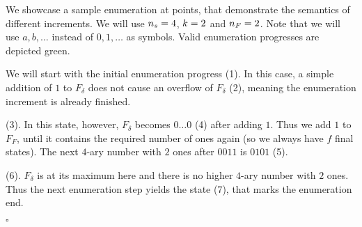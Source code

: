 \begin{example}
	We showcase a sample enumeration at points, that demonstrate the semantics of different increments. We will use ${n_s}=4$, $k=2$ and ${n_F}=2$. Note that we will use $a,b,\ldots$ instead of $0,1,\ldots$ as symbols. Valid enumeration progresses are depicted green.\par
	\vspace{0.4cm}\noindent
	\begin{minipage}{0.56\textwidth}
		We will start with the initial enumeration progress (1). In this case, a simple addition of $1$ to $F_\delta$ does not cause an overflow of $F_\delta$ (2), meaning the enumeration increment is already finished.\bigskip
		
		(3). In this state, however, $F_\delta$ becomes $0\ldots0$ (4) after adding $1$. Thus we add $1$ to $F_F$, until it contains the required number of ones again (so we always have $f$ final states). The next $4$-ary number with $2$ ones after $0011$ is $0101$ (5).\bigskip
		
		(6). $F_\delta$ is at its maximum here and there is no higher $4$-ary number with $2$ ones. Thus the next enumeration step yields the state (7), that marks the enumeration end.
	\end{minipage}
	\hfill
	\begin{minipage}{0.4\textwidth}
	\end{minipage}\par
	\hfill$\square$
\end{example}

